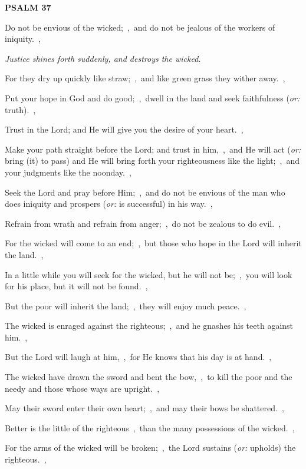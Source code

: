 \documentclass[12pt,twoside,a5paper]{article}
\newcommand{\psalm}[1]{\textbf{PSALM {#1}}\nopagebreak}
\newcommand{\qanona}[1]{{\liturgicalhint{Qanona.} \emph{#1}}}
\newcommand{\translationoption}[1]{\emph{or:} #1}
\begin{document}
\psalm{37}

\begin{normalparskip}
  Do not be envious of the wicked;~\sep\ and do not be jealous of the workers of iniquity.~\sep

  \qanona{Justice shines forth suddenly, and destroys the wicked.}

  For they dry up quickly like straw;~\sep\ and like green grass they wither away.~\sep

  Put your hope in God and do good;~\sep\ dwell in the land and seek faithfulness (\translationoption{truth}).~\sep

  Trust in the Lord; and He will give you the desire of your heart.~\sep

  Make your path straight before the Lord; and trust in him,~\sep\ and He will act (\translationoption{bring (it) to pass}) and He will bring forth your righteousness like the light;~\sep\ and your judgments like the noonday.~\sep

  Seek the Lord and pray before Him;~\sep\ and do not be envious of the man who does iniquity and prospers (\translationoption{is successful}) in his way.~\sep

  Refrain from wrath and refrain from anger;~\sep\ do not be zealous to do evil.~\sep

  For the wicked will come to an end;~\sep\ but those who hope in the Lord will inherit the land.~\sep

  In a little while you will seek for the wicked, but he will not be;~\sep\ you will look for his place, but it will not be found.~\sep

  But the poor will inherit the land;~\sep\ they will enjoy much peace.~\sep

  The wicked is enraged against the righteous;~\sep\ and he gnashes his teeth against him.~\sep

  But the Lord will laugh at him,~\sep\ for He knows that his day is at hand.~\sep

  The wicked have drawn the sword and bent the bow,~\sep\ to kill the poor and the needy and those whose ways are upright.~\sep

  May their sword enter their own heart;~\sep\ and may their bows be shattered.~\sep

  Better is the little of the righteous~\sep\ than the many possessions of the wicked.~\sep

  For the arms of the wicked will be broken;~\sep\ the Lord sustains (\translationoption{upholds}) the righteous.~\sep


\end{normalparskip}
\end{document}

